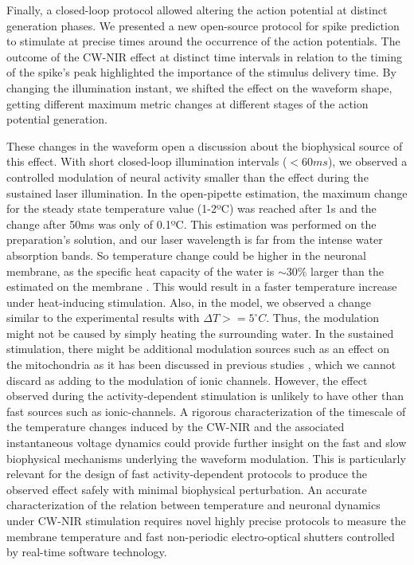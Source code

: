 Finally, a closed-loop protocol allowed altering the action potential at distinct generation phases. We presented a new open-source protocol for spike prediction to stimulate at precise times around the occurrence of the action potentials. The outcome of the CW-NIR effect at distinct time intervals in relation to the timing of the spike's peak highlighted the importance of the stimulus delivery time. By changing the illumination instant, we shifted the effect on the waveform shape, getting different maximum metric changes at different stages of the action potential generation.

These changes in the waveform open a discussion about the biophysical source of this effect. With short closed-loop illumination intervals ($<60ms$), we observed a controlled modulation of neural activity smaller than the effect during the sustained laser illumination. In the open-pipette estimation, the maximum change for the steady state temperature value (1-2ºC) was reached after 1s and the change after 50ms was only of 0.1ºC. This estimation was performed on the preparation's solution, and our laser wavelength is far from the intense water absorption bands. So temperature change could be higher in the neuronal membrane, as the specific heat capacity of the water is $\sim30\%$ larger than the estimated on the membrane \parencite{thompson_modeling_2012}. This would result in a faster temperature increase under heat-inducing stimulation. Also, in the model, we observed a change similar to the experimental results with $\Delta T>=5^{\circ}C$. Thus, the modulation might not be caused by simply heating the surrounding water. In the sustained stimulation, there might be additional modulation sources such as an effect on the mitochondria as it has been discussed in previous studies \parencite{dittami_intracellular_2011, lumbreras_pulsed_2014, saucedo_transcranial_2021}, which we cannot discard as adding to the modulation of ionic channels. However, the effect observed during the activity-dependent stimulation is unlikely to have other than fast sources such as ionic-channels. 
A rigorous characterization of the timescale of the temperature changes induced by the CW-NIR and the associated instantaneous voltage dynamics could provide further insight on the fast and slow biophysical mechanisms underlying the waveform modulation. This is particularly relevant for the design of fast activity-dependent protocols to produce the observed effect safely with minimal biophysical perturbation. An accurate characterization of the relation between temperature and neuronal dynamics under CW-NIR stimulation requires novel highly precise protocols to measure the membrane temperature and fast non-periodic electro-optical shutters controlled by real-time software technology.

